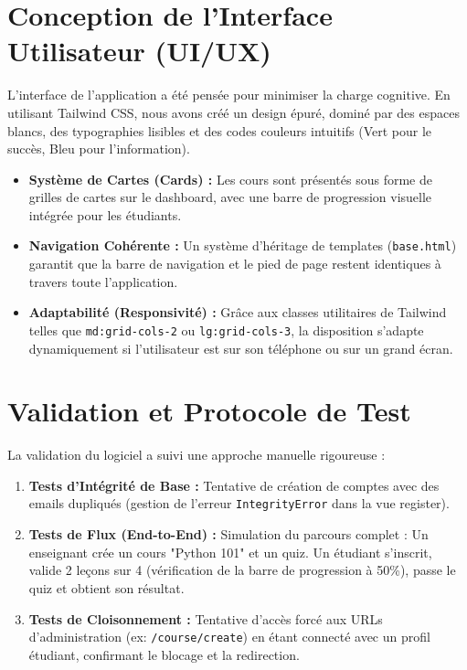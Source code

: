 \documentclass[12pt,a4paper]{report}
\begin{document}
\section{Conception de l'Interface Utilisateur (UI/UX)}
L'interface de l'application a été pensée pour minimiser la charge cognitive. En utilisant Tailwind CSS, nous avons créé un design épuré, dominé par des espaces blancs, des typographies lisibles et des codes couleurs intuitifs (Vert pour le succès, Bleu pour l'information).
\begin{itemize}
    \item \textbf{Système de Cartes (Cards) :} Les cours sont présentés sous forme de grilles de cartes sur le dashboard, avec une barre de progression visuelle intégrée pour les étudiants.
    \item \textbf{Navigation Cohérente :} Un système d'héritage de templates (\texttt{base.html}) garantit que la barre de navigation et le pied de page restent identiques à travers toute l'application.
    \item \textbf{Adaptabilité (Responsivité) :} Grâce aux classes utilitaires de Tailwind telles que \texttt{md:grid-cols-2} ou \texttt{lg:grid-cols-3}, la disposition s'adapte dynamiquement si l'utilisateur est sur son téléphone ou sur un grand écran.
\end{itemize}

\section{Validation et Protocole de Test}
La validation du logiciel a suivi une approche manuelle rigoureuse :
\begin{enumerate}
    \item \textbf{Tests d'Intégrité de Base :} Tentative de création de comptes avec des emails dupliqués (gestion de l'erreur \texttt{IntegrityError} dans la vue register).
    \item \textbf{Tests de Flux (End-to-End) :} Simulation du parcours complet : Un enseignant crée un cours "Python 101" et un quiz. Un étudiant s'inscrit, valide 2 leçons sur 4 (vérification de la barre de progression à 50\%), passe le quiz et obtient son résultat.
    \item \textbf{Tests de Cloisonnement :} Tentative d'accès forcé aux URLs d'administration (ex: \texttt{/course/create}) en étant connecté avec un profil étudiant, confirmant le blocage et la redirection.
\end{enumerate}
\end{document}
